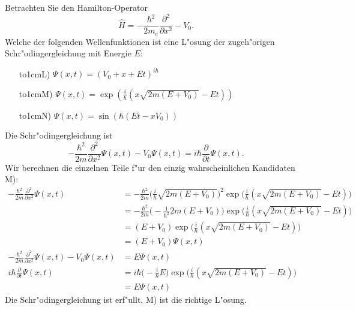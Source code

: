 Betrachten Sie den Hamilton-Operator
\[
\hat H=-\frac{\hbar^2}{2m_e}\frac{\partial^2}{\partial x^2}-V_0.
\]
Welche der folgenden Wellenfunktionen ist eine L"osung der zugeh"origen
Schr"odingergleichung mit Energie $E$:
\begin{itemize}
\item[\hbox to1cm{L)\hfill}]
$
\Psi(x,t)
=
(V_0+x+Et)^{i\hbar}
$
\item[\hbox to1cm{M)\hfill}]
$
\Psi(x,t)
=
\exp\left(\frac{i}{\hbar}(x\sqrt{2m(E+V_0)}-Et)\right)
$
\item[\hbox to1cm{N)\hfill}]
$
\Psi(x,t)
=
\sin(\hbar (Et-xV_0))
$
\end{itemize}

\begin{loesung}
Die Schr"odingergleichung ist 
\[
-\frac{\hbar^2}{2m}\frac{\partial^2}{\partial x^2}\Psi(x,t)-V_0\Psi(x,t)=i\hbar\frac{\partial}{\partial t}\Psi(x,t).
\]
Wir berechnen die einzelnen Teile f"ur den einzig wahrscheinlichen
Kandidaten M):
\begin{align*}
-\frac{\hbar^2}{2m}
\frac{\partial^2}{\partial x^2}
\Psi(x,t)
&=
-\frac{\hbar^2}{2m}
\biggl(\frac{i}{\hbar}\sqrt{2m(E+V_0)}\biggr)^2
\exp\biggl(\frac{i}{\hbar}(x\sqrt{2m(E+V_0)}-Et)\biggr)
\\
&=
-\frac{\hbar^2}{2m}
\biggl(-\frac{1}{\hbar^2}2m(E+V_0)\biggr)
\exp\biggl(\frac{i}{\hbar}(x\sqrt{2m(E+V_0)}-Et)\biggr)
\\
&=
(E+V_0)
\exp\biggl(\frac{i}{\hbar}(x\sqrt{2m(E+V_0)}-Et)\biggr)
\\
&=(E+V_0)\Psi(x,t)
\\
-\frac{\hbar^2}{2m}
\frac{\partial^2}{\partial x^2}
\Psi(x,t)
-V_0\Psi(x,t)
&=
E\Psi(x,t)
\\
i\hbar
\frac{\partial}{\partial t} \Psi(x,t)
&=
i\hbar
\biggl(-\frac{i}{\hbar}E\biggr)
\exp\biggl(\frac{i}{\hbar}(x\sqrt{2m(E+V_0)}-Et)\biggr)
\\
&=
E\Psi(x,t)
\end{align*}
Die Schr"odingergleichung ist erf"ullt, M) ist die richtige L"osung.
\end{loesung}
